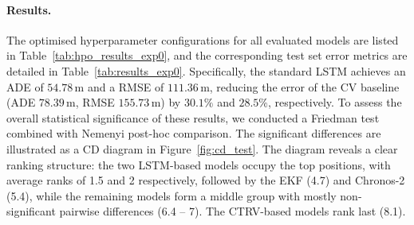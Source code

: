 \paragraph{Results.}
The optimised hyperparameter configurations for all evaluated models are listed in Table~\ref{tab:hpo_results_exp0}, and the corresponding test set error metrics are detailed in Table~\ref{tab:results_exp0}.
Specifically, the standard \ac{LSTM} achieves an \ac{ADE} of $54.78$\,m and a \acf{RMSE} of $111.36$\,m, reducing the error of the \ac{CV} baseline (\ac{ADE} $78.39$\,m, \ac{RMSE} $155.73$\,m) by $30.1\%$ and $28.5\%$, respectively.
To assess the overall statistical significance of these results, we conducted a Friedman test combined with Nemenyi post-hoc comparison.
The significant differences are illustrated as a \ac{CD} diagram in Figure~\ref{fig:cd_test}. 
The diagram reveals a clear ranking structure: the two LSTM-based models occupy the top positions, with average ranks of 1.5 and 2 respectively, followed by the \ac{EKF} (4.7) and Chronos-2 (5.4), while the remaining models form a middle group with mostly non-significant pairwise differences (6.4 -- 7).
The CTRV-based models rank last (8.1).



